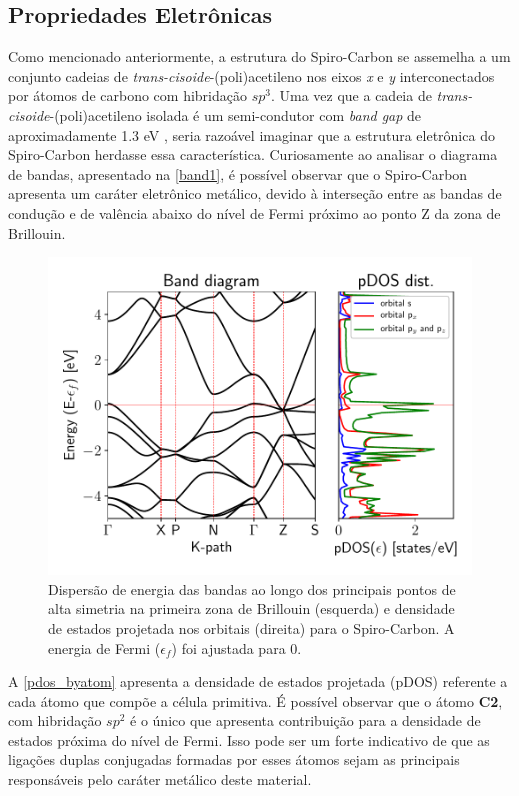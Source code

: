 	\subsection{Propriedades Eletrônicas}
	
	Como mencionado anteriormente, a estrutura do Spiro-Carbon se assemelha a um conjunto cadeias de \textit{trans-cisoide}-(poli)acetileno nos eixos \textit{x} e \textit{y} interconectados por átomos de carbono com hibridação $sp^3$. Uma vez que a cadeia de \textit{trans-cisoide}-(poli)acetileno isolada é um semi-condutor com \textit{band gap} de aproximadamente 1.3 eV \cite{baughman1982structural}, seria razoável imaginar que a estrutura eletrônica do Spiro-Carbon herdasse essa característica. Curiosamente ao analisar o diagrama de bandas, apresentado na \autoref{band1}, é possível observar que o Spiro-Carbon apresenta um caráter eletrônico metálico, devido à interseção entre as bandas de condução e de valência abaixo do nível de Fermi próximo ao ponto Z da zona de Brillouin. 
	
	
	\begin{figure}[!ht]
		\centering
			\includegraphics[width=.8\linewidth]{capitulos/fig/results1/bands_smearing}
		\caption{Dispersão de energia das bandas ao longo dos principais pontos de alta simetria na primeira zona de Brillouin (esquerda) e densidade de estados projetada nos orbitais (direita) para o Spiro-Carbon. A energia de Fermi ($\epsilon_f$) foi ajustada para 0.}
		\label{band1}
	\end{figure}

	A \autoref{pdos_byatom} apresenta a densidade de estados projetada (pDOS) referente a cada átomo que compõe a célula primitiva. É possível observar que o átomo \textbf{C2}, com hibridação $sp^2$ é o único que apresenta contribuição para a densidade de estados próxima do nível de Fermi. Isso pode ser um forte indicativo de que as ligações duplas conjugadas formadas por esses átomos sejam as principais responsáveis pelo caráter metálico deste material. 
	
